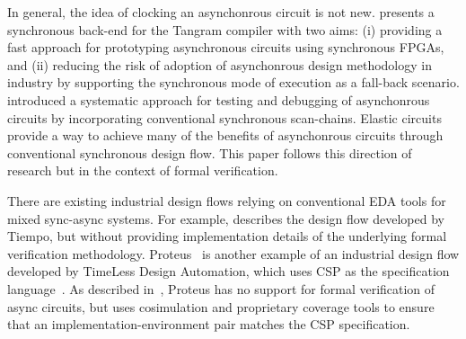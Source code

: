 In general, the idea of clocking an asynchonrous circuit is not new.
\cite{peeters2001synchronous} presents a synchronous back-end for the Tangram
compiler with two aims: (i) providing a fast approach for prototyping asynchronous
circuits using synchronous FPGAs, and (ii) reducing the risk of adoption of
asynchonrous design methodology in industry by supporting the synchronous mode of
execution as a fall-back scenario. \cite{van2003adding} introduced a systematic
approach for testing and debugging of asynchonrous circuits by incorporating
conventional synchronous scan-chains. Elastic circuits~\cite{carmona2009elastic}
provide a way to achieve many of the benefits of asynchonrous circuits through
conventional synchronous design flow. This paper follows this direction of
research but in the context of formal verification.


There are existing industrial design flows relying on conventional EDA tools
for mixed sync-async systems. For example, \cite{yakovlev2013advances}
describes the design flow developed by Tiempo, but without providing
implementation details of the underlying formal verification methodology.
Proteus~\cite{beerel2011proteus} is another example of an industrial design
flow developed by TimeLess Design Automation, which uses CSP as the
specification language~\cite{beerel2010designer}. As described
in~\cite{beerel2011proteus}, Proteus has no support for formal verification of
async circuits, but uses cosimulation and proprietary coverage tools to ensure
that an implementation-environment pair matches the CSP specification.
